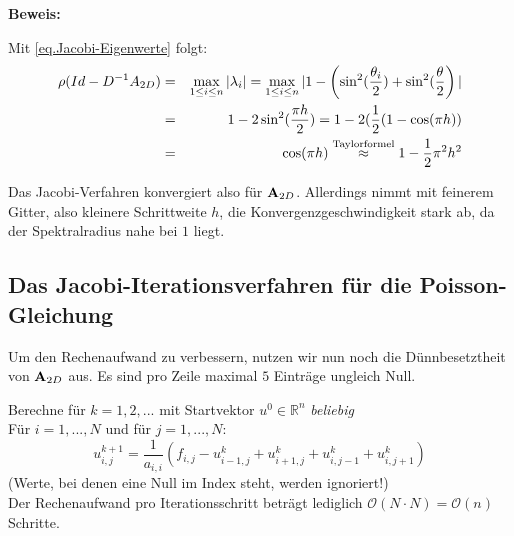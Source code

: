 \textbf{Beweis:}\label{b.Spektral Jacobi}

Mit \autoref{eq.Jacobi-Eigenwerte} folgt:
\begin{eqnarray}
\rho(Id-D^{-1}A_{2D}) &=& \max_{1 \le i \le n} | \lambda_{i} | = \max_{1 \le i \le n} | 1 - \left(\sin^{2}(\frac {\theta_{i}} {2}) + \sin^{2}(\frac {\theta_{}} {2} \right) | \notag \\
&=& 1 - 2\sin^{2} (\frac {\pi h} {2}) = 1 - 2(\frac{1} {2} (1 - \cos (\pi h)) \notag \\
&=& \cos (\pi h) \overset{\textnormal{Taylorformel}}{\approx} 1 - \frac {1} {2} \pi^{2} h^{2} \notag
\end{eqnarray}

Das Jacobi-Verfahren konvergiert also für ${\textbf{A}}_{2D}$. Allerdings nimmt mit feinerem Gitter, also kleinere Schrittweite $h$, die Konvergenzgeschwindigkeit stark ab, da der Spektralradius nahe bei $1$ liegt.

\subsection{Das Jacobi-Iterationsverfahren für die Poisson-Gleichung}\label{ss.Jacobi-Verfahren der Poisson Gleichung}

Um den Rechenaufwand zu verbessern, nutzen wir nun noch die Dünnbesetztheit von ${\textbf{A}}_{2D}$ aus. Es sind pro Zeile maximal $5$ Einträge ungleich Null.



Berechne für $k = 1,2,...$ mit Startvektor $u^{0} \in \mathbb{R}^{n}$ \textit{beliebig}\\
Für $i = 1,...,N$ und für $j = 1,...,N$:
\begin{equation}
u^{k+1}_{i,j} =  \frac {1} {a_{i,i}} (f_{i,j} - u^{k}_{i-1,j} + u^{k}_{i+1,j} + u^{k}_{i,j-1} + u^{k}_{i,j+1})
\end{equation}
(Werte, bei denen eine Null im Index steht, werden ignoriert!)\\
Der Rechenaufwand pro Iterationsschritt beträgt lediglich $\mathcal{O}(N \cdot N) = \mathcal{O}(n)$ Schritte.

